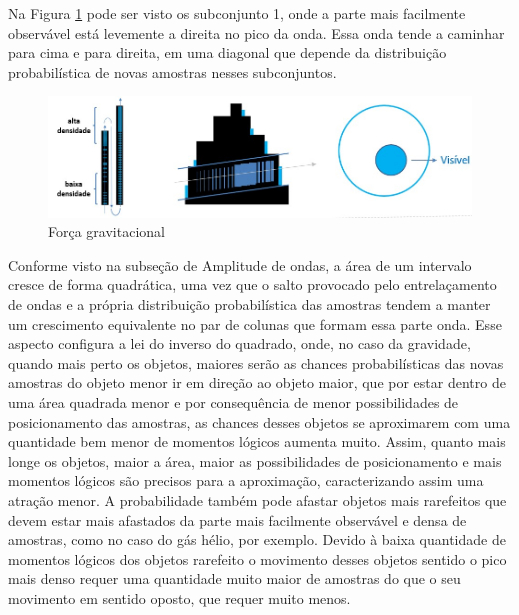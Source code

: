 Na Figura \ref{fig:consciousness_gravitational_force} pode ser visto os subconjunto 1, onde a parte mais facilmente observável está levemente a direita no pico da onda. Essa onda tende a caminhar para cima e para direita, em uma diagonal que depende da distribuição probabilística de novas amostras nesses subconjuntos.
	\begin{figure}[H]
	\caption{Força gravitacional}
	\label{fig:consciousness_gravitational_force}
	\centering
	\includegraphics[scale=.6]{sections/images/consciousness_gravitational_force.jpg}
	\end{figure}

Conforme visto na subseção de Amplitude de ondas, a área de um intervalo cresce de forma quadrática, uma vez que o salto provocado pelo entrelaçamento de ondas e a própria distribuição probabilística das amostras tendem a manter um crescimento equivalente no par de colunas que formam essa parte onda. Esse aspecto configura a lei do inverso do quadrado, onde, no caso da gravidade, quando mais perto os objetos, maiores serão as chances probabilísticas das novas amostras do objeto menor ir em direção ao objeto maior, que por estar dentro de uma área quadrada menor e por consequência de menor possibilidades de posicionamento das amostras, as chances desses objetos se aproximarem com uma quantidade bem menor de momentos lógicos aumenta muito. Assim, quanto mais longe os objetos, maior a área, maior as possibilidades de posicionamento e mais momentos lógicos são precisos para a aproximação, caracterizando assim uma atração menor. A probabilidade também pode afastar objetos mais rarefeitos que devem estar mais afastados da parte mais facilmente observável e densa de amostras, como no caso do gás hélio, por exemplo. Devido à baixa quantidade de momentos lógicos dos objetos rarefeito o movimento desses objetos sentido o pico mais denso requer uma quantidade muito maior de amostras do que o seu movimento em sentido oposto, que requer muito menos.

